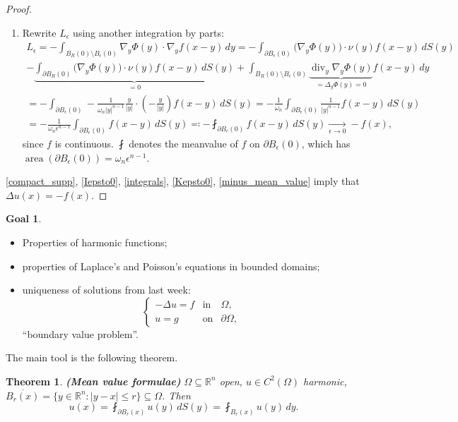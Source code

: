 \documentclass[12pt]{article}
\DeclareMathOperator{\diver}{div}
\DeclareMathOperator{\area}{area}
\newtheorem{theorem}{Theorem}[section]
\theoremstyle{definition}
\newtheorem*{goal}{Goal}
\begin{document}
\begin{proof}
\begin{enumerate}[label=\arabic*.]
\item Rewrite $L_\epsilon$ using another integration by parts:
\begin{multline}\tag{5}\label{minus_mean_value}
L_\epsilon=-\int_{B_R(0)\setminus B_\epsilon(0)}\nabla_y\Phi(y)\cdot\nabla_yf(x-y)\,dy=-\int_{\partial B_\epsilon(0)}\big(\nabla_y\Phi(y)\big)\cdot\nu(y)f(x-y)\,dS(y)\\
-\underbrace{\int_{\partial B_R(0)}\big(\nabla_y\Phi(y)\big)\cdot\nu(y)f(x-y)\,dS(y)}_{=0}+\int_{B_R(0)\setminus B_\epsilon(0)}\underbrace{\diver_y\nabla_y\Phi(y)}_{=\Delta_y\Phi(y)=0}f(x-y)\,dy\\
=-\int_{\partial B_\epsilon(0)}-\frac1{\omega_n|y|^{n-1}}\frac y{|y|}\cdot\left(-\frac y{|y|}\right)f(x-y)\,dS(y)=-\frac1{\omega_n}\int_{\partial B_\epsilon(0)}\frac1{|y|^{n-1}}f(x-y)\,dS(y)\\
=-\frac1{\omega_n\epsilon^{n-1}}\int_{\partial B_\epsilon(0)}f(x-y)\,dS(y)\eqqcolon-\fint_{\partial B_\epsilon(0)}f(x-y)\,dS(y)\xrightarrow[\epsilon\to0]{}-f(x),
\end{multline}
since $f$ is continuous. $\fint$ denotes the meanvalue of $f$ on $\partial B_\epsilon(0)$, which has $\area(\partial B_\epsilon(0))=\omega_n\epsilon^{n-1}$.
\end{enumerate}

\ref{compact_supp}, \ref{Iepsto0}, \ref{integrals}, \ref{Kepsto0}, \eqref{minus_mean_value} imply that $\Delta u(x)=-f(x)$.
\end{proof}

\begin{goal}
\begin{itemize}
\item Properties of harmonic functions;
\item properties of Laplace's and Poisson's equations in bounded domains;
\item uniqueness of solutions from last week:
\[\left\{\begin{array}{lll}-\Delta u=f&\text{in}&\Omega,\\u=g&\text{on}&\partial\Omega,\end{array}\right.\]
``boundary value problem''.
\end{itemize}
\end{goal}

The main tool is the following theorem.

\begin{theorem}
\emph{\textbf{(Mean value formulae)}} $\Omega\subseteq\mathbb R^n$ open, $u\in C^2(\Omega)$ harmonic, $\overline{B_r(x)}=\{y\in\mathbb R^n:|y-x|\leq r\}\subseteq\Omega$. Then
\[u(x)=\fint_{\partial B_r(x)}u(y)\,dS(y)=\fint_{B_r(x)}u(y)\,dy.\]
\end{theorem}
\end{document}
